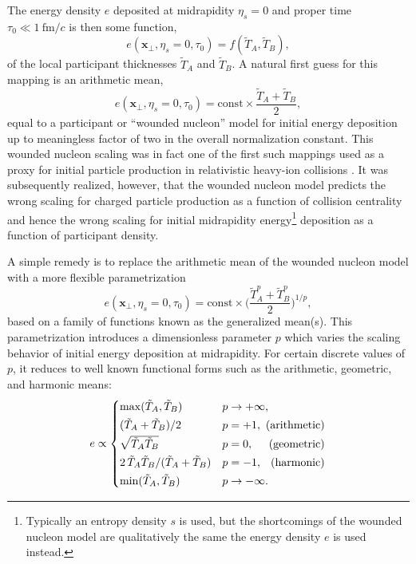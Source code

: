 \documentclass[aps,prc,reprint,amsmath,nofootinbib]{revtex4-1}
\newcommand{\fmc}{\ensuremath{\text{fm}/c}}
\newcommand{\T}{\tilde{T}}
\newcommand{\xv}{\mathbf x}
\begin{document}
The energy density $e$ deposited at midrapidity $\eta_s=0$ and proper time $\tau_0 \ll 1~\fmc$ is then some function,
\begin{equation}
  e(\xv_\perp, \eta_s=0, \tau_0) = f(\T_A, \T_B),
\end{equation}
of the local participant thicknesses $\T_A$ and $\T_B$.
A natural first guess for this mapping is an arithmetic mean,
\begin{equation}
  e(\xv_\perp, \eta_s=0, \tau_0) = \text{const} \times \frac{\T_A + \T_B}{2},
\end{equation}
equal to a participant or ``wounded nucleon'' model for initial energy deposition up to meaningless factor of two in the overall normalization constant.
This wounded nucleon scaling was in fact one of the first such mappings used as a proxy for initial particle production in relativistic heavy-ion collisions \cite{Bialas:1976ed}.
It was subsequently realized, however, that the wounded nucleon model predicts the wrong scaling for charged particle production as a function of collision centrality \cite{Kharzeev:2000ph} and hence the wrong scaling for initial midrapidity energy\footnote{Typically an entropy density $s$ is used, but the shortcomings of the wounded nucleon model are qualitatively the same the energy density $e$ is used instead.} deposition as a function of participant density.

A simple remedy is to replace the arithmetic mean of the wounded nucleon model with a more flexible parametrization
\begin{equation}
  \label{eq:gmean}
  e(\xv_\perp, \eta_s=0, \tau_0) = \text{const} \times \bigg( \frac{\T_A^p + \T_B^p}{2} \bigg)^{1/p},
\end{equation}
based on a family of functions known as the generalized mean(s).
This parametrization introduces a dimensionless parameter $p$ which varies the scaling behavior of initial energy deposition at midrapidity.
For certain discrete values of $p$, it reduces to well known functional forms such as the arithmetic, geometric, and harmonic means:
\begin{equation}
  \newlength{\extraspace}
  \setlength{\extraspace}{0.5ex}
  e \propto
  \begin{cases}
    \max(\T_A, \T_B) & p \rightarrow +\infty, \\[\extraspace]
    (\T_A + \T_B)/2 & p = +1, \hfill \text{ (arithmetic)} \\[\extraspace]
    \sqrt{\T_A \T_B} & p = 0, \hfill \text{ (geometric)} \\[\extraspace]
    2\, \T_A \T_B/(\T_A + \T_B) & p = -1, \hfill \text{ (harmonic)} \\[\extraspace]
    \min(\T_A, \T_B) & p \rightarrow -\infty.
  \end{cases}
  \label{eq:trento_p}
\end{equation}
\end{document}
